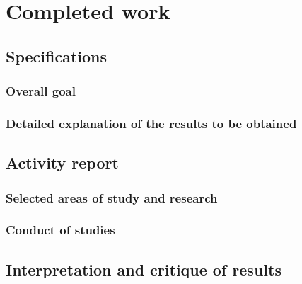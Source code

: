 \chapter{Completed work}
\section{Specifications}
\subsection{Overall goal}
\subsection{Detailed explanation of the results to be obtained}
\section{Activity report}
\subsection{Selected areas of study and research}
\subsection{Conduct of studies}
\section{Interpretation and critique of results}